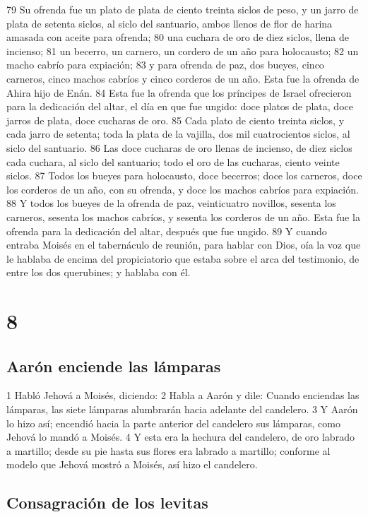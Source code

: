79 Su ofrenda fue un plato de plata de ciento treinta siclos de peso,  y un jarro de plata de setenta siclos, al siclo del santuario, ambos llenos de flor de harina amasada con aceite para ofrenda;
80 una cuchara de oro de diez siclos,  llena de incienso;
81 un becerro, un carnero, un cordero de un año para holocausto;
82 un macho cabrío para expiación;
83 y para ofrenda de paz, dos bueyes, cinco carneros, cinco machos cabríos y cinco corderos de un año. Esta fue la ofrenda de Ahira hijo de Enán.
84 Esta fue la ofrenda que los príncipes de Israel ofrecieron para la dedicación del altar, el día en que fue ungido: doce platos de plata, doce jarros de plata, doce cucharas de oro.
85 Cada plato de ciento treinta siclos,  y cada jarro de setenta; toda la plata de la vajilla, dos mil cuatrocientos siclos, al siclo del santuario.
86 Las doce cucharas de oro llenas de incienso, de diez siclos   cada cuchara, al siclo del santuario; todo el oro de las cucharas, ciento veinte siclos.
87 Todos los bueyes para holocausto, doce becerros; doce los carneros, doce los corderos de un año, con su ofrenda, y doce los machos cabríos para expiación.
88 Y todos los bueyes de la ofrenda de paz, veinticuatro novillos, sesenta los carneros, sesenta los machos cabríos, y sesenta los corderos de un año. Esta fue la ofrenda para la dedicación del altar, después que fue ungido.
89 Y cuando entraba Moisés en el tabernáculo de reunión, para hablar con Dios, oía la voz que le hablaba de encima del propiciatorio que estaba sobre el arca del testimonio, de entre los dos querubines; y hablaba con él.

\chapter{8}

\section*{Aarón enciende las lámparas}

1 Habló Jehová a Moisés, diciendo:
2 Habla a Aarón y dile: Cuando enciendas las lámparas, las siete lámparas alumbrarán hacia adelante del candelero.
3 Y Aarón lo hizo así; encendió hacia la parte anterior del candelero sus lámparas, como Jehová lo mandó a Moisés.
4 Y esta era la hechura del candelero, de oro labrado a martillo; desde su pie hasta sus flores era labrado a martillo; conforme al modelo que Jehová mostró a Moisés, así hizo el candelero.

\section*{Consagración de los levitas}

